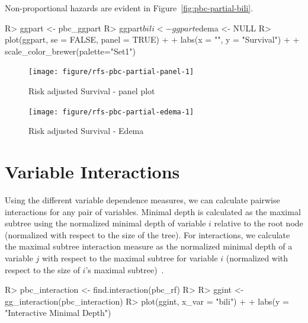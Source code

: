 \documentclass[nojss]{jss}\usepackage[]{graphicx}\usepackage[]{color}
\begin{document}
Non-proportional hazards are evident in Figure~\ref{fig:pbc-partial-bili}.

\begin{Schunk}
\begin{Sinput}
R> ggpart <- pbc_ggpart
R> ggpart$bili <- ggpart$edema <- NULL
R> plot(ggpart, se = FALSE, panel = TRUE) + 
+   labs(x = "", y = "Survival") +
+   scale_color_brewer(palette="Set1")
\end{Sinput}
\begin{figure}[!htpb]

{\centering \texttt{[image: figure/rfs-pbc-partial-panel-1]} 

}

\caption[Risk adjusted Survival - panel plot]{Risk adjusted Survival - panel plot\label{fig:pbc-partial-panel}}
\end{figure}
\end{Schunk}

\begin{Schunk}
\begin{figure}[!htpb]

{\centering \texttt{[image: figure/rfs-pbc-partial-edema-1]} 

}

\caption[Risk adjusted Survival - Edema]{Risk adjusted Survival - Edema\label{fig:pbc-partial-edema}}
\end{figure}
\end{Schunk}
\section{Variable Interactions}\label{S:interactions}
Using the different variable dependence measures, we can calculate pairwise interactions for any pair of variables. Minimal depth is calculated as the maximal subtree using the normalized minimal depth of variable $i$ relative to the root node (normalized with respect to the size of the tree). For interactions, we calculate the maximal subtree interaction measure as the normalized minimal depth of a variable $j$ with respect to the maximal subtree for variable $i$ (normalized with respect to the size of $i$'s maximal subtree)~\citep{Ishwaran_HighDimension:2010,Ishwaran_HighDimension:2011}.

\begin{Schunk}
\begin{Sinput}
R> pbc_interaction <- find.interaction(pbc_rf)
R> 
R> ggint <- gg_interaction(pbc_interaction)
R> plot(ggint, x_var = "bili") + 
+   labs(y = "Interactive Minimal Depth")
\end{Sinput}
\end{Schunk}
\end{document}

